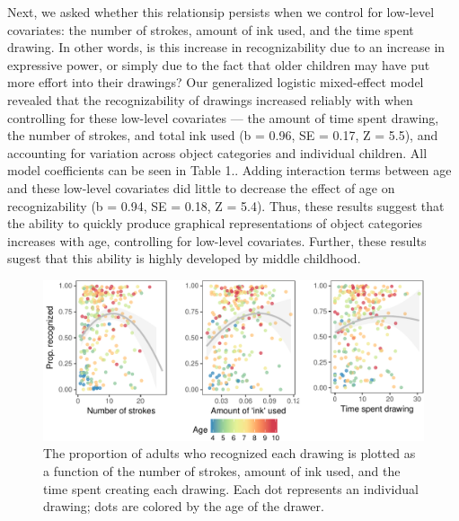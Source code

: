 \documentclass[10pt, letterpaper]{article}
\newenvironment{CodeChunk}{}{}
\begin{document}
Next, we asked whether this relationsip persists when we control for
low-level covariates: the number of strokes, amount of ink used, and the
time spent drawing. In other words, is this increase in recognizability
due to an increase in expressive power, or simply due to the fact that
older children may have put more effort into their drawings? Our
generalized logistic mixed-effect model revealed that the
recognizability of drawings increased reliably with when controlling for
these low-level covariates --- the amount of time spent drawing, the
number of strokes, and total ink used (b = 0.96, SE = 0.17, Z = 5.5),
and accounting for variation across object categories and individual
children. All model coefficients can be seen in Table 1.. Adding
interaction terms between age and these low-level covariates did little
to decrease the effect of age on recognizability (b = 0.94, SE = 0.18, Z
= 5.4). Thus, these results suggest that the ability to quickly produce
graphical representations of object categories increases with age,
controlling for low-level covariates. Further, these results sugest that
this ability is highly developed by middle childhood.

\begin{CodeChunk}
\begin{figure}[h]

{\centering \includegraphics{figs/covDescriptives-1} 

}

\caption[The proportion of adults who recognized each drawing is plotted as a function of the number of strokes, amount of ink used, and the time spent creating each drawing]{The proportion of adults who recognized each drawing is plotted as a function of the number of strokes, amount of ink used, and the time spent creating each drawing. Each dot represents an individual drawing; dots are colored by the age of the drawer.}\label{fig:covDescriptives}
\end{figure}
\end{CodeChunk}
\end{document}
